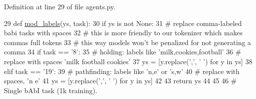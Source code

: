 Definition at line 29 of file agents.\+py.


\begin{DoxyCode}
29 \textcolor{keyword}{def }\hyperlink{namespaceparlai_1_1tasks_1_1babi_1_1agents_a80ee701751bc608fcb01bcfb1e884de0}{mod\_labels}(ys, task):
30     \textcolor{keywordflow}{if} ys \textcolor{keywordflow}{is} \textcolor{keywordflow}{not} \textcolor{keywordtype}{None}:
31         \textcolor{comment}{# replace comma-labeled babi tasks with spaces}
32         \textcolor{comment}{# this is more friendly to our tokenizer which makes commas full tokens}
33         \textcolor{comment}{# this way models won't be penalized for not generating a comma}
34         \textcolor{keywordflow}{if} task == \textcolor{stringliteral}{'8'}:
35             \textcolor{comment}{# holding: labels like 'milk,cookies,football'}
36             \textcolor{comment}{# replace with spaces 'milk football cookies'}
37             ys = [y.replace(\textcolor{stringliteral}{','}, \textcolor{stringliteral}{' '}) \textcolor{keywordflow}{for} y \textcolor{keywordflow}{in} ys]
38         \textcolor{keywordflow}{elif} task == \textcolor{stringliteral}{'19'}:
39             \textcolor{comment}{# pathfinding: labels like 'n,e' or 's,w'}
40             \textcolor{comment}{# replace with spaces, 'n e'}
41             ys = [y.replace(\textcolor{stringliteral}{','}, \textcolor{stringliteral}{' '}) \textcolor{keywordflow}{for} y \textcolor{keywordflow}{in} ys]
42 
43     \textcolor{keywordflow}{return} ys
44 
45 
46 \textcolor{comment}{# Single bAbI task (1k training).}
\end{DoxyCode}
